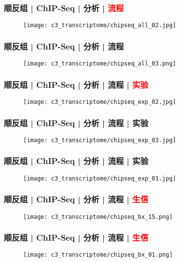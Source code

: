 \begin{frame}
  \frametitle{顺反组 | ChIP-Seq | 分析 | \textcolor{red}{流程}}
  \begin{figure}
    \centering
    \texttt{[image: c3\_transcriptome/chipseq\_all\_02.jpg]}
  \end{figure}
\end{frame}

\begin{frame}
  \frametitle{顺反组 | ChIP-Seq | 分析 | 流程}
  \begin{figure}
    \centering
    \texttt{[image: c3\_transcriptome/chipseq\_all\_03.png]}
  \end{figure}
\end{frame}

\begin{frame}
  \frametitle{顺反组 | ChIP-Seq | 分析 | 流程 | \textcolor{red}{实验}}
  \begin{figure}
    \centering
    \texttt{[image: c3\_transcriptome/chipseq\_exp\_02.jpg]}
  \end{figure}
\end{frame}

\begin{frame}
  \frametitle{顺反组 | ChIP-Seq | 分析 | 流程 | 实验}
  \begin{figure}
    \centering
    \texttt{[image: c3\_transcriptome/chipseq\_exp\_03.jpg]}
  \end{figure}
\end{frame}

\begin{frame}
  \frametitle{顺反组 | ChIP-Seq | 分析 | 流程 | 实验}
  \begin{figure}
    \centering
    \texttt{[image: c3\_transcriptome/chipseq\_exp\_01.jpg]}
  \end{figure}
\end{frame}

\begin{frame}
  \frametitle{顺反组 | ChIP-Seq | 分析 | 流程 | \textcolor{red}{生信}}
  \begin{figure}
    \centering
    \texttt{[image: c3\_transcriptome/chipseq\_bx\_15.png]}
  \end{figure}
\end{frame}

\begin{frame}
  \frametitle{顺反组 | ChIP-Seq | 分析 | 流程 | \textcolor{red}{生信}}
  \begin{figure}
    \centering
    \texttt{[image: c3\_transcriptome/chipseq\_bx\_01.png]}
  \end{figure}
\end{frame}

